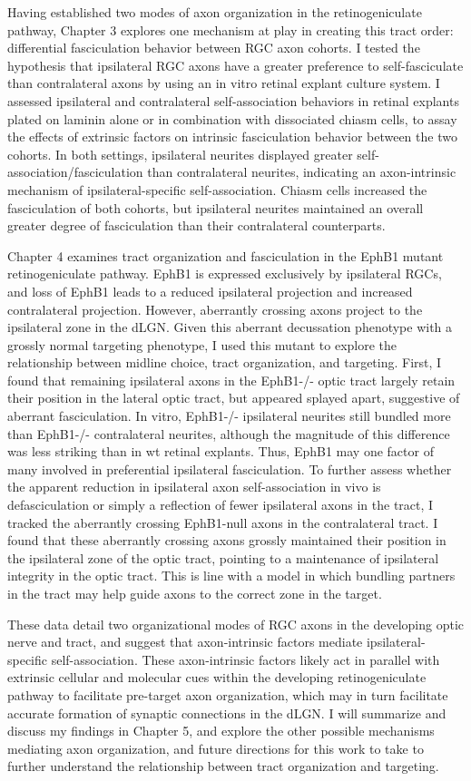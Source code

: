 Having established two modes of axon organization in the retinogeniculate pathway, Chapter 3 explores one mechanism at play in creating this tract order: differential fasciculation behavior between RGC axon cohorts.
I tested the hypothesis that ipsilateral RGC axons have a greater preference to self-fasciculate than contralateral axons by using an in vitro retinal explant culture system.
I assessed ipsilateral and contralateral self-association behaviors in retinal explants plated on laminin alone or in combination with dissociated chiasm cells, to assay the effects of extrinsic factors on intrinsic fasciculation behavior between the two cohorts.
In both settings, ipsilateral neurites displayed greater self-association/fasciculation than contralateral neurites, indicating an axon-intrinsic mechanism of ipsilateral-specific self-association. 
Chiasm cells increased the fasciculation of both cohorts, but ipsilateral neurites maintained an overall greater degree of fasciculation than their contralateral counterparts. 

Chapter 4 examines tract organization and fasciculation in the EphB1 mutant retinogeniculate pathway.
EphB1 is expressed exclusively by ipsilateral RGCs, and loss of EphB1 leads to a reduced ipsilateral projection and increased contralateral projection.
However, aberrantly crossing axons project to the ipsilateral zone in the dLGN.
Given this aberrant decussation phenotype with a grossly normal targeting phenotype, I used this mutant to explore the relationship between midline choice, tract organization, and targeting.
First, I found that remaining ipsilateral axons in the EphB1-/- optic tract largely retain their position in the lateral optic tract, but appeared splayed apart, suggestive of aberrant fasciculation.
In vitro, EphB1-/- ipsilateral neurites still bundled more than EphB1-/- contralateral neurites, although the magnitude of this difference was less striking than in wt retinal explants.
Thus, EphB1 may one factor of many involved in preferential ipsilateral fasciculation.
To further assess whether the apparent reduction in ipsilateral axon self-association in vivo is defasciculation or simply a reflection of fewer ipsilateral axons in the tract, I tracked the aberrantly crossing EphB1-null axons in the contralateral tract.
I found that these aberrantly crossing axons grossly maintained their position in the ipsilateral zone of the optic tract, pointing to a maintenance of ipsilateral integrity in the optic tract.
This is line with a model in which bundling partners in the tract may help guide axons to the correct zone in the target.

These data detail two organizational modes of RGC axons in the developing optic nerve and tract, and suggest that axon-intrinsic factors mediate ipsilateral-specific self-association.
These axon-intrinsic factors likely act in parallel with extrinsic cellular and molecular cues within the developing retinogeniculate pathway to facilitate pre-target axon organization, which may in turn facilitate accurate formation of synaptic connections in the dLGN.
I will summarize and discuss my findings in Chapter 5, and explore the other possible mechanisms mediating axon organization, and future directions for this work to take to further understand the relationship between tract organization and targeting.